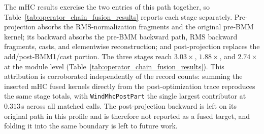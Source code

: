The mHC results exercise the two entries of this path together, so Table~\ref{tab:operator_chain_fusion_results} reports each stage separately. Pre-projection absorbs the RMS-normalization fragments and the original pre-BMM kernel; its backward absorbs the pre-BMM backward path, RMS backward fragments, casts, and elementwise reconstruction; and post-projection replaces the add/post-BMM1/cast portion. The three stages reach $3.03\times$, $1.88\times$, and $2.74\times$ at the module level (Table~\ref{tab:operator_chain_fusion_results}). This attribution is corroborated independently of the record counts: summing the inserted mHC fused kernels directly from the post-optimization trace reproduces the same stage totals, with \texttt{WindMhcPostPart} the single largest contributor at $0.313$\,s across all matched calls. The post-projection backward is left on its original path in this profile and is therefore not reported as a fused target, and folding it into the same boundary is left to future work.

